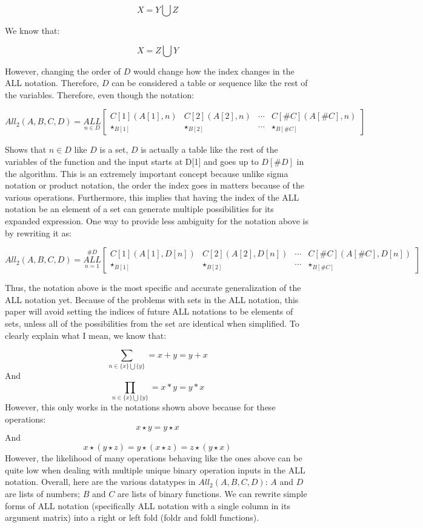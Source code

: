 \documentclass{article}
\begin{document}
$$X=Y\bigcup Z$$

We know that:

$$X=Z\bigcup Y$$

However, changing the order of $D$ would change how the index changes in the ALL notation. Therefore, $D$ can be considered a table or sequence like the rest of the variables. Therefore, even though the notation:

$$All_2(A, B, C, D)=\underset{n \in D}{ALL} \begin{bmatrix}
C[1](A[1],n) & C[2](A[2],n) & \cdots & C[\#C](A[\#C],n) \\
\star_{B[1]}& \star_{B[2]} & \cdots & \star_{B[\#C]}
\end{bmatrix}$$

Shows that $n \in D$ like $D$ is a set, $D$ is actually a table like the rest of the variables of the function and the input starts at D[1] and goes up to $D[\#D]$ in the algorithm. This is an extremely important concept because unlike sigma notation or product notation, the order the index goes in matters because of the various operations. Furthermore, this implies that having the index of the ALL notation be an element of a set can generate multiple possibilities for its expanded expression. One way to provide less ambiguity for the notation above is by rewriting it as:

$$All_2(A, B, C, D)=\underset{n=1}{\overset{\#D}{ALL}} \begin{bmatrix}
C[1](A[1],D[n]) & C[2](A[2],D[n]) & \cdots & C[\#C](A[\#C],D[n]) \\
\star_{B[1]}& \star_{B[2]} & \cdots & \star_{B[\#C]}
\end{bmatrix}$$

Thus, the notation above is the most specific and accurate generalization of the ALL notation yet. Because of the problems with sets in the ALL notation, this paper will avoid setting the indices of future ALL notations to be elements of sets, unless all of the possibilities from the set are identical when simplified. To clearly explain what I mean, we know that:

$$\underset{n \in \{ x \} \bigcup \{ y \} }{\sum} = x+y = y+x$$
And
$$\underset{n \in \{ x \} \bigcup \{ y \} }{\prod} = x*y = y*x$$
However, this only works in the notations shown above because for these operations:
$$x\star y = y \star x$$
And
$$x \star (y \star z) = y \star (x \star z) = z \star (y \star x)$$
However, the likelihood of many operations behaving like the ones above can be quite low when dealing with multiple unique binary operation inputs in the ALL notation. Overall, here are the various datatypes in $All_2(A,B,C,D)$: $A$ and $D$ are lists of numbers; $B$ and $C$ are lists of binary functions. We can rewrite simple forms of ALL notation (specifically ALL notation with a single column in its argument matrix) into a right or left fold (foldr and foldl functions).
\end{document}
